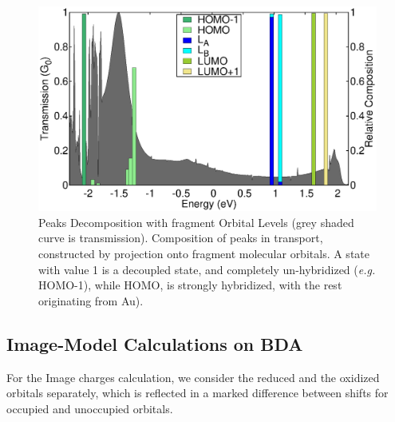 \documentclass[aip,jcp,a4paper,reprint,floatfix,superscriptaddress]{revtex4-1}
\newcommand{\etal}{\emph{et al.}\xspace}
\newcommand{\eg}{\emph{e.g.}\xspace}
\begin{document}
\begin{figure}
   \includegraphics[width=\columnwidth]{img/BDA/BDA-decomposition}
\caption{Peaks Decomposition with fragment Orbital Levels (grey shaded curve is transmission). Composition of peaks in transport, constructed by projection onto fragment molecular orbitals. A state with value 1 is a decoupled state, and completely un-hybridized (\eg HOMO-1), while HOMO, is strongly hybridized, with the rest originating from Au).}\label{fg:BDA-peak-composition}
\end{figure}



\subsection{Image-Model Calculations on BDA}\label{imagemodelcalcsBDA}

For the Image charges calculation, we consider the reduced and the oxidized orbitals separately, which is reflected in a marked difference between shifts for occupied and unoccupied orbitals.
\end{document}
